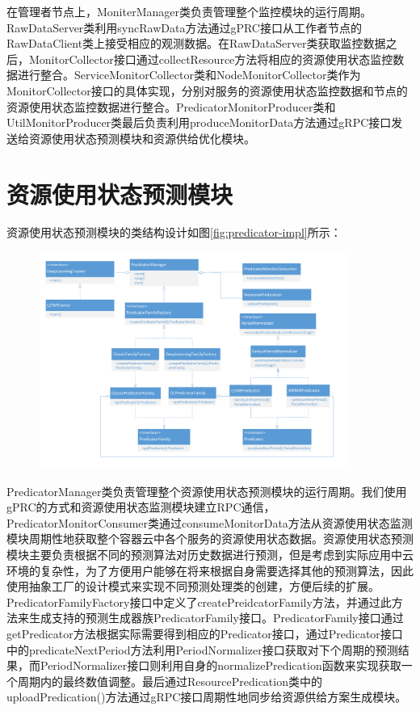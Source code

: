 在管理者节点上，MoniterManager类负责管理整个监控模块的运行周期。RawDataServer类利用syncRawData方法通过gPRC接口从工作者节点的RawDataClient类上接受相应的观测数据。在RawDataServer类获取监控数据之后，MonitorCollector接口通过collectResource方法将相应的资源使用状态监控数据进行整合。ServiceMonitorCollector类和NodeMonitorCollector类作为MonitorCollector接口的具体实现，分别对服务的资源使用状态监控数据和节点的资源使用状态监控数据进行整合。PredicatorMonitorProducer类和UtilMonitorProducer类最后负责利用produceMonitorData方法通过gRPC接口发送给资源使用状态预测模块和资源供给优化模块。

\section{资源使用状态预测模块}
资源使用状态预测模块的类结构设计如图\ref{fig:predicator-impl}所示：
\begin{figure}[H]
\centering
\includegraphics[width=0.9\textwidth]{./figure/predicator_impl}
\end{figure}

PredicatorManager类负责管理整个资源使用状态预测模块的运行周期。我们使用gPRC的方式和资源使用状态监测模块建立RPC通信，PredicatorMonitorConsumer类通过consumeMonitorData方法从资源使用状态监测模块周期性地获取整个容器云中各个服务的资源使用状态数据。资源使用状态预测模块主要负责根据不同的预测算法对历史数据进行预测，但是考虑到实际应用中云环境的复杂性，为了方便用户能够在将来根据自身需要选择其他的预测算法，因此使用抽象工厂的设计模式来实现不同预测处理类的创建，方便后续的扩展。PredicatorFamilyFactory接口中定义了createPreidcatorFamily方法，并通过此方法来生成支持的预测生成器族PredicatorFamily接口。PredicatorFamily接口通过getPredicator方法根据实际需要得到相应的Predicator接口，通过Predicator接口中的predicateNextPeriod方法利用PeriodNormalizer接口获取对下个周期的预测结果，而PeriodNormalizer接口则利用自身的normalizePredication函数来实现获取一个周期内的最终数值调整。最后通过ResourcePredication类中的uploadPredication()方法通过gRPC接口周期性地同步给资源供给方案生成模块。

